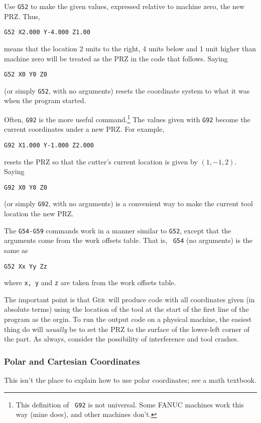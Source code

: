 \documentclass[titlepage,oneside,10pt]{article}
\newcommand{\ger}{\textsc{Ger}}
\begin{document}
Use {\tt G52} to make the given values, expressed relative to machine
zero, the new PRZ. Thus, 
\begin{verbatim}
G52 X2.000 Y-4.000 Z1.00
\end{verbatim}
means that the location 2 units to the right, 4 units below and 1 unit
higher than machine zero will be treated as the PRZ in the code that
follows. Saying
\begin{verbatim}
G52 X0 Y0 Z0
\end{verbatim}
(or simply {\tt G52}, with no arguments) resets the coordinate system
to what it was when the program started.

Often, {\tt G92} is the more useful command.\footnote{This definition of {\tt
  G92} is not universal. Some FANUC machines work this way (mine
does), and other machines don't. }  The values given with 
{\tt G92} become the current coordinates under a new PRZ. For example, 
\begin{verbatim}
G92 X1.000 Y-1.000 Z2.000
\end{verbatim}
resets the PRZ so that the cutter's current location is given
by $(1,-1,2)$. Saying 
\begin{verbatim}
G92 X0 Y0 Z0
\end{verbatim}
(or simply {\tt G92}, with no arguments) is a convenient way to make
the current tool location the new PRZ.


The {\tt G54-G59} commands work in a manner similar to {\tt G52}, except
that the arguments come from the work offsets table. That is, {\tt
  G54} (no arguments) is the same as
\begin{verbatim}
G52 Xx Yy Zz
\end{verbatim}
where {\tt x, y} and {\tt z} are taken from the work offsets table. 

The important point is that \ger\ will produce code with all coordinates
given (in absolute terms) using the location of the tool at the start
of the first line of the program as the orgin. To run the output code
on a physical machine, the easiest thing do will {\it usually} be to
set the PRZ to the surface of the lower-left corner of the part. As
always, consider the possibility of interference and tool crashes.

\subsubsection{Polar and Cartesian Coordinates}

This isn't the place to explain how to use polar coordinates; see a
math textbook.
\end{document}
